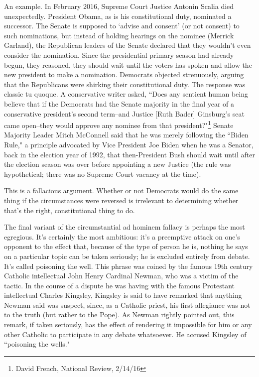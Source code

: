 An example. In February 2016, Supreme Court Justice Antonin Scalia died unexpectedly.
President Obama, as is his constitutional duty, nominated a successor. The Senate is supposed to
`advise and consent' (or not consent) to such nominations, but instead of holding hearings on the
nominee (Merrick Garland), the Republican leaders of the Senate declared that they wouldn't even
consider the nomination. Since the presidential primary season had already begun, they reasoned,
they should wait until the voters has spoken and allow the new president to make a nomination.
Democrats objected strenuously, arguing that the Republicans were shirking their constitutional
duty. The response was classic tu quoque. A conservative writer asked, ``Does any sentient human
being believe that if the Democrats had the Senate majority in the final year of a conservative
president's second term--and Justice [Ruth Bader] Ginsburg's seat came open--they would
approve any nominee from that 
president?"\footnote{David French, National Review, 2/14/16}
Senate Majority Leader Mitch McConnell said that
he was merely following the ``Biden Rule," a principle advocated by Vice President Joe Biden
when he was a Senator, back in the election year of 1992, that then-President Bush should wait
until after the election season was over before appointing a new Justice (the rule was hypothetical;
there was no Supreme Court vacancy at the time).

This is a fallacious argument. Whether or not Democrats would do the same thing if the
circumstances were reversed is irrelevant to determining whether that's the right, constitutional
thing to do.

The final variant of the circumstantial ad hominem fallacy is perhaps the most egregious. It's
certainly the most ambitious: it's a preemptive attack on one's opponent to the effect that, because
of the type of person he is, nothing he says on a particular topic can be taken seriously; he is
excluded entirely from debate. It's called poisoning the well. This phrase was coined by the famous
19th century Catholic intellectual John Henry Cardinal Newman, who was a victim of the tactic. In
the course of a dispute he was having with the famous Protestant intellectual Charles Kingsley,
Kingsley is said to have remarked that anything Newman said was suspect, since, as a Catholic
priest, his first allegiance was not to the truth (but rather to the Pope). As Newman rightly pointed
out, this remark, if taken seriously, has the effect of rendering it impossible for him or any other
Catholic to participate in any debate whatsoever. He accused Kingsley of ``poisoning the wells."

